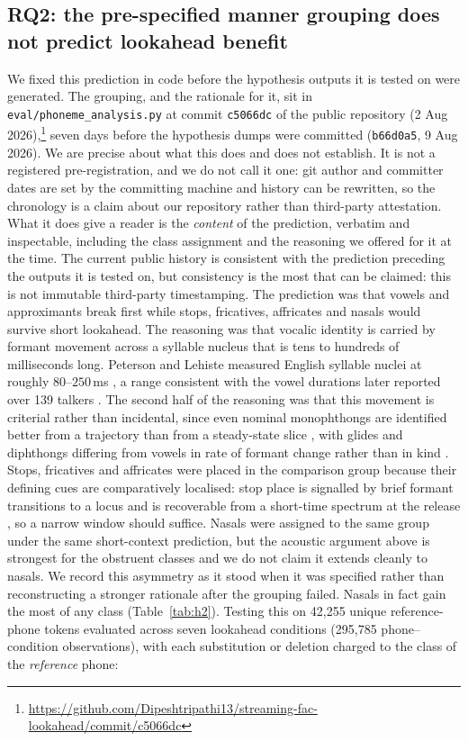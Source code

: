 \documentclass[journal]{IEEEtran}
\begin{document}
\subsection{RQ2: the pre-specified manner grouping does not predict lookahead benefit}
\label{sec:rq2}

We fixed this prediction in code before the hypothesis outputs it is tested on
were generated. The grouping, and the rationale for it, sit in
\texttt{eval/phoneme\_analysis.py} at commit \texttt{c5066dc} of the public
repository (2 Aug 2026),\footnote{\url{https://github.com/Dipeshtripathi13/streaming-fac-lookahead/commit/c5066dc}}
seven days before the hypothesis dumps were committed (\texttt{b66d0a5}, 9 Aug
2026). We are precise about what this does and does not establish. It is not a
registered pre-registration, and we do not call it one: git author and
committer dates are set by the
committing machine and history can be rewritten, so the chronology is a claim
about our repository rather than third-party attestation. What it does give a
reader is the \emph{content} of the prediction, verbatim and inspectable,
including the class assignment and the reasoning we offered for it at the
time. The current public history is consistent with the prediction preceding
the outputs it is tested on, but consistency is the most that can be claimed:
this is not immutable third-party timestamping. The prediction was
that vowels and approximants break first while stops, fricatives, affricates
and nasals would survive short lookahead. The reasoning was that vocalic
identity is carried by formant movement across a syllable nucleus that is tens
to hundreds of milliseconds long. Peterson and Lehiste measured English
syllable nuclei at roughly $80$--$250$\,ms \cite{petersonlehiste1960}, a range
consistent with the vowel durations later reported over 139
talkers \cite{hillenbrand1995}. The second half of the reasoning was that this
movement is criterial rather
than incidental, since even nominal monophthongs are identified better from a
trajectory than from a steady-state slice \cite{nearey1986}, with glides and
diphthongs differing from vowels in rate of formant change rather than in
kind \cite{lehistepeterson1961}. Stops, fricatives and affricates were placed
in the comparison group because their defining cues are comparatively
localised: stop place is signalled by brief formant transitions to a
locus \cite{delattre1955} and is recoverable from a short-time spectrum at the
release \cite{stevensblumstein1978}, so a narrow window should suffice. Nasals
were assigned to the same group under the same short-context prediction, but
the acoustic argument above is strongest for the obstruent classes and we do
not claim it extends cleanly to nasals. We record this asymmetry as it stood
when it was specified rather than reconstructing a stronger rationale after the
grouping failed. Nasals in fact gain the most of any class
(Table~\ref{tab:h2}). Testing this on 42{,}255 unique reference-phone tokens evaluated across seven
lookahead conditions (295{,}785 phone--condition observations), with each
substitution or deletion charged to the class of the \emph{reference} phone:
\end{document}
